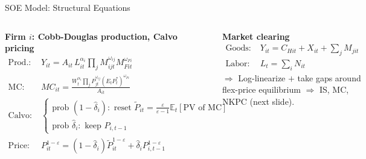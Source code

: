 \documentclass[aspectratio=169, 10pt]{beamer}
\begin{document}
\begin{frame}{SOE Model: Structural Equations}
\begin{columns}[t]
{\footnotesize \textbf{Firm $i$: Cobb-Douglas production, Calvo pricing}}
\vspace{-3pt}
{\scriptsize\begin{align*}
\text{Prod.:}\; & Y_{it} = A_{it}\, L_{it}^{\alpha_i}\prod_j M_{ijt}^{\omega_{ij}} M_{Fit}^{\omega_{Fi}} \\[0pt]
\text{MC:}\; & MC_{it} = \frac{W_t^{\alpha_i}\prod_j P_{jt}^{\omega_{ij}}(E_t P^*_t)^{\omega_{Fi}}}{A_{it}} \\[0pt]
\text{Calvo:}\; & \begin{cases} \text{prob } (1{-}\hat\delta_i): \text{ reset } \tilde{P}_{it} = \tfrac{\varepsilon}{\varepsilon-1}\mathbb{E}_t[\text{PV of MC}] \\ \text{prob } \hat\delta_i: \text{ keep } P_{i,t-1} \end{cases} \\[1pt]
\text{Price:}\; & P_{it}^{1-\varepsilon} = (1{-}\hat\delta_i)\tilde{P}_{it}^{1-\varepsilon} + \hat\delta_i P_{i,t-1}^{1-\varepsilon}
\end{align*}}

\vspace{1pt}
{\footnotesize \textbf{Market clearing}}
\vspace{-3pt}
{\scriptsize\begin{align*}
\text{Goods:}\; & Y_{it} = C_{Hit} + X_{it} + \textstyle\sum_j M_{jit} \\[0pt]
\text{Labor:}\; & L_t = \textstyle\sum_i N_{it}
\end{align*}}
\vspace{-4pt}
{\scriptsize $\Rightarrow$ Log-linearize $+$ take gaps around flex-price equilibrium $\Rightarrow$ IS, MC, NKPC (next slide).}

\end{columns}
\end{frame}
\end{document}
